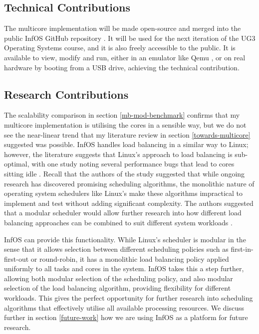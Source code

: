 \documentclass[bsc,frontabs,singlespacing,parskip,deptreport]{infthesis}
\begin{document}
\subsection{Technical Contributions}
The multicore implementation will be made open-source and merged into the public InfOS GitHub repository \cite{infos}. It will be used for the next iteration of the UG3 Operating Systems course, and it is also freely accessible to the public. It is available to view, modify and run, either in an emulator like Qemu \cite{qemu}, or on real hardware by booting from a USB drive, achieving the technical contribution.

\subsection{Research Contributions}
The scalability comparison in section \ref{mb-mod-benchmark} confirms that my multicore implementation is utilising the cores in a sensible way, but we do not see the near-linear trend that my literature review in section \ref{towards-multicore} suggested was possible. InfOS handles load balancing in a similar way to Linux; however, the literature suggests that Linux's approach to load balancing is sub-optimal, with one study noting several performance bugs that lead to cores sitting idle \cite{wasted-cores}. Recall that the authors of the study suggested that  while ongoing research has discovered promising scheduling algorithms, the monolithic nature of operating system schedulers like Linux's make these algorithms impractical to implement and test without adding significant complexity. The authors suggested that a modular scheduler would allow further research into how different load balancing approaches can be combined to suit different system workloads \cite{wasted-cores}.

InfOS can provide this functionality. While Linux's scheduler is modular in the sense that it allows selection between different scheduling policies such as first-in-first-out or round-robin, it has a monolithic load balancing policy applied uniformly to all tasks and cores in the system. InfOS takes this a step further, allowing both modular selection of the scheduling policy, and also modular selection of the load balancing algorithm, providing flexibility for different workloads. This gives the perfect opportunity for further research into scheduling algorithms that effectively utilise all available processing resources. We discuss further in section \ref{future-work} how we are using InfOS as a platform for future research.
\end{document}
